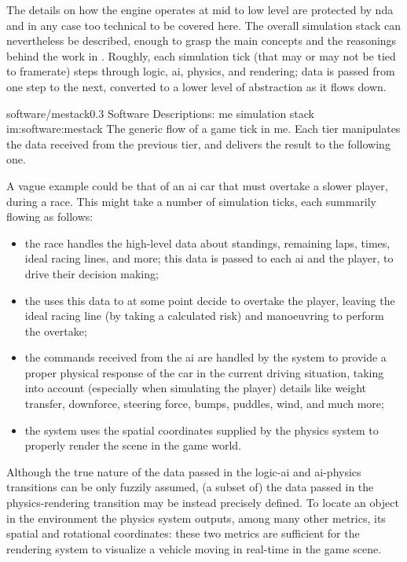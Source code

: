 The details on how the engine operates at mid to low level are protected by \gls{nda} and in any case too technical to be covered here. The overall simulation stack can nevertheless be described, enough to grasp the main concepts and the reasonings behind the work in . Roughly, each simulation tick (that may or may not be tied to framerate) steps through logic, \gls{ai}, physics, and rendering; data is passed from one step to the next, converted to a lower level of abstraction as it flows down.

\begin{image}
	{software/mestack}{0.3}
	{Software Descriptions: \gls{me} simulation stack}
	{im:software:mestack}
	{}
	{The generic flow of a game tick in \gls{me}. Each tier manipulates the data received from the previous tier, and delivers the result to the following one.}
\end{image}

A vague example could be that of an \gls{ai} car that must overtake a slower player, during a race. This might take a number of simulation ticks, each summarily flowing as follows:

\begin{itemize}
	\item the race  handles the high-level data about standings, remaining laps, times, ideal racing lines, and more; this data is passed to each \gls{ai} and the player, to drive their decision making;
	\item the  uses this data to at some point decide to overtake the player, leaving the ideal racing line (by taking a calculated risk) and manoeuvring to perform the overtake;
	\item the commands received from the \gls{ai} are handled by the  system to provide a proper physical response of the car in the current driving situation, taking into account (especially when simulating the player) details like weight transfer, downforce, steering force, bumps, puddles, wind, and much more;
	\item the  system uses the spatial coordinates supplied by the physics system to properly render the scene in the game world.
\end{itemize}

Although the true nature of the data passed in the logic-\gls{ai} and \gls{ai}-physics transitions can be only fuzzily assumed, (a subset of) the data passed in the physics-rendering transition may be instead precisely defined. To locate an object in the environment the physics system outputs, among many other metrics, its spatial and rotational coordinates: these two metrics are sufficient for the rendering system to visualize a vehicle moving in real-time in the game scene.

